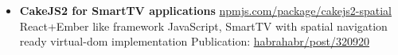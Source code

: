 \documentclass[a4paper,11pt]{article}
\begin{document}
{\begin{itemize}[itemsep=4pt,label=]
  \item \textbf{CakeJS2 for SmartTV applications} \href{https://www.npmjs.com/package/cakejs2-spatial}{npmjs.com/package/cakejs2-spatial}\\
    React+Ember like framework \hfill  JavaScript, SmartTV \break
    with spatial navigation ready virtual-dom implementation\hfill\break
    Publication: \href{https://habrahabr.ru/post/320920/}{habrahabr/post/320920}

\end{itemize}
%
%

%
%
%
%
%
%



%
%

}
\end{document}

